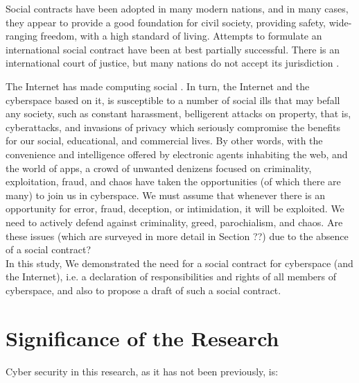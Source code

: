 Social contracts have been adopted in many modern nations, and in many cases, they appear to provide a good foundation for civil society, providing safety, wide-ranging freedom, with a high standard of living. Attempts to formulate an international social contract have been at best partially successful. There is an international court of justice, but many nations do not accept its jurisdiction \cite{Robertson}.

The Internet has made computing social  \cite{parameswaran2007social}. In turn, the Internet and the cyberspace based on it, is susceptible to a number of social ills that may befall any society, such as constant harassment, belligerent attacks on property, that is, cyberattacks, and invasions of privacy which seriously compromise the benefits for our social, educational, and commercial lives. By other words, with the convenience and intelligence offered by electronic agents inhabiting the web, and the world of apps, a crowd of unwanted denizens focused on criminality, exploitation, fraud, and chaos have taken the opportunities (of which there are many) to join us in cyberspace.  We must assume that whenever there is an opportunity for error, fraud, deception, or intimidation, it will be exploited. We need to actively defend against criminality, greed, parochialism, and chaos. Are these issues (which are surveyed in more detail in Section ??) due to the absence of a social contract? \\ In this study, We demonstrated the need for a social contract for cyberspace (and the Internet), i.e. a declaration of responsibilities and rights of all members of cyberspace, and also to propose a draft of such a social contract.

\section{Significance of the Research}

Cyber security in this research, as it has not been previously, is:


